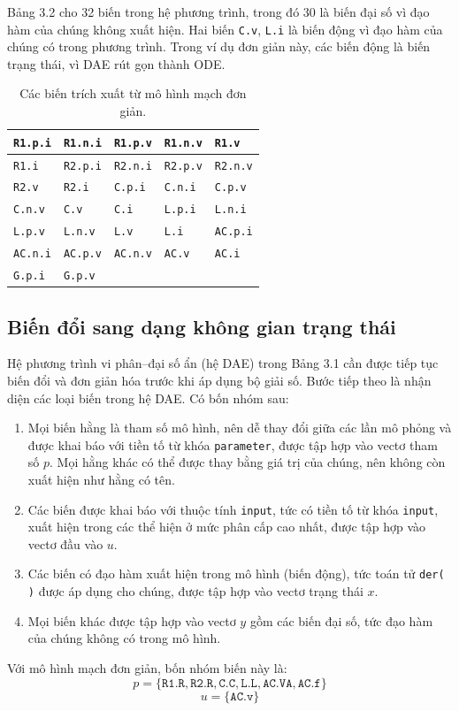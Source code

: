 Bảng 3.2 cho 32 biến trong hệ phương trình, trong đó 30 là biến đại số vì đạo hàm của chúng không xuất hiện. Hai biến \texttt{C.v}, \texttt{L.i} là biến động vì đạo hàm của chúng có trong phương trình. Trong ví dụ đơn giản này, các biến động là biến trạng thái, vì DAE rút gọn thành ODE.
\begin{table}[htbp]
\centering
\begin{tabular}{|l|l|l|l|l|}
\hline
\texttt{R1.p.i}&\texttt{R1.n.i}&\texttt{R1.p.v}&\texttt{R1.n.v}&\texttt{R1.v}\\\hline
\texttt{R1.i}&\texttt{R2.p.i}&\texttt{R2.n.i}&\texttt{R2.p.v}&\texttt{R2.n.v}\\\hline
\texttt{R2.v}&\texttt{R2.i}&\texttt{C.p.i}&\texttt{C.n.i}&\texttt{C.p.v}\\\hline
\texttt{C.n.v}&\texttt{C.v}&\texttt{C.i}&\texttt{L.p.i}&\texttt{L.n.i}\\\hline
\texttt{L.p.v}&\texttt{L.n.v}&\texttt{L.v}&\texttt{L.i}&\texttt{AC.p.i}\\\hline
\texttt{AC.n.i}&\texttt{AC.p.v}&\texttt{AC.n.v}&\texttt{AC.v}&\texttt{AC.i}\\\hline
\texttt{G.p.i}&\texttt{G.p.v}&&&\\\hline
\end{tabular}
\caption{Các biến trích xuất từ mô hình mạch đơn giản.}
\end{table}

\subsection{Biến đổi sang dạng không gian trạng thái}
Hệ phương trình vi phân--đại số ẩn (hệ DAE) trong Bảng 3.1 cần được tiếp tục biến đổi và đơn giản hóa trước khi áp dụng bộ giải số. Bước tiếp theo là nhận diện các loại biến trong hệ DAE. Có bốn nhóm sau:
\begin{enumerate}
\item Mọi biến hằng là tham số mô hình, nên dễ thay đổi giữa các lần mô phỏng và được khai báo với tiền tố từ khóa \texttt{parameter}, được tập hợp vào vectơ tham số $p$. Mọi hằng khác có thể được thay bằng giá trị của chúng, nên không còn xuất hiện như hằng có tên.
\item Các biến được khai báo với thuộc tính \texttt{input}, tức có tiền tố từ khóa \texttt{input}, xuất hiện trong các thể hiện ở mức phân cấp cao nhất, được tập hợp vào vectơ đầu vào $u$.
\item Các biến có đạo hàm xuất hiện trong mô hình (biến động), tức toán tử \texttt{der( )} được áp dụng cho chúng, được tập hợp vào vectơ trạng thái $x$.
\item Mọi biến khác được tập hợp vào vectơ $y$ gồm các biến đại số, tức đạo hàm của chúng không có trong mô hình.
\end{enumerate}
Với mô hình mạch đơn giản, bốn nhóm biến này là:
\[
p=\{\mathtt{R1.R},\mathtt{R2.R},\mathtt{C.C},\mathtt{L.L},\mathtt{AC.VA},\mathtt{AC.f}\}
\]
\[u=\{\mathtt{AC.v}\}\]

